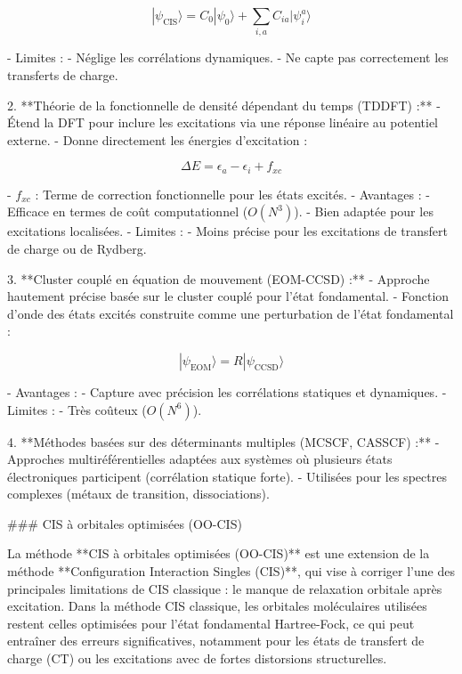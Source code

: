 \documentclass[12pt,a4paper]{report}
\begin{document}
\begin{markdown}
\begin{equation}
|\psi_{\text{CIS}}\rangle = C_0 |\psi_0\rangle + \sum_{i,a} C_{ia} |\psi_i^a\rangle
\end{equation}

   - Limites :
     - Néglige les corrélations dynamiques.
     - Ne capte pas correctement les transferts de charge.

2. **Théorie de la fonctionnelle de densité dépendant du temps (TDDFT) :**
   - Étend la DFT pour inclure les excitations via une réponse linéaire au potentiel externe.
   - Donne directement les énergies d'excitation :

\begin{equation}
\Delta E = \epsilon_a - \epsilon_i + f_{xc}
\end{equation}

   - $f_{xc}$ : Terme de correction fonctionnelle pour les états excités.
   - Avantages :
     - Efficace en termes de coût computationnel ($O(N^3)$).
     - Bien adaptée pour les excitations localisées.
   - Limites :
     - Moins précise pour les excitations de transfert de charge ou de Rydberg.

3. **Cluster couplé en équation de mouvement (EOM-CCSD) :**
   - Approche hautement précise basée sur le cluster couplé pour l’état fondamental.
   - Fonction d’onde des états excités construite comme une perturbation de l’état fondamental :

\begin{equation}
|\psi_{\text{EOM}}\rangle = R |\psi_{\text{CCSD}}\rangle
\end{equation}

   - Avantages :
     - Capture avec précision les corrélations statiques et dynamiques.
   - Limites :
     - Très coûteux ($O(N^6)$).

4. **Méthodes basées sur des déterminants multiples (MCSCF, CASSCF) :**
   - Approches multiréférentielles adaptées aux systèmes où plusieurs états électroniques participent (corrélation statique forte).
   - Utilisées pour les spectres complexes (métaux de transition, dissociations).


### CIS à orbitales optimisées (OO-CIS)

La méthode **CIS à orbitales optimisées (OO-CIS)** est une extension de la méthode **Configuration Interaction Singles (CIS)**, qui vise à corriger l'une des principales limitations de CIS classique : le manque de relaxation orbitale après excitation. Dans la méthode CIS classique, les orbitales moléculaires utilisées restent celles optimisées pour l'état fondamental Hartree-Fock, ce qui peut entraîner des erreurs significatives, notamment pour les états de transfert de charge (CT) ou les excitations avec de fortes distorsions structurelles.


\end{markdown}
\end{document}
